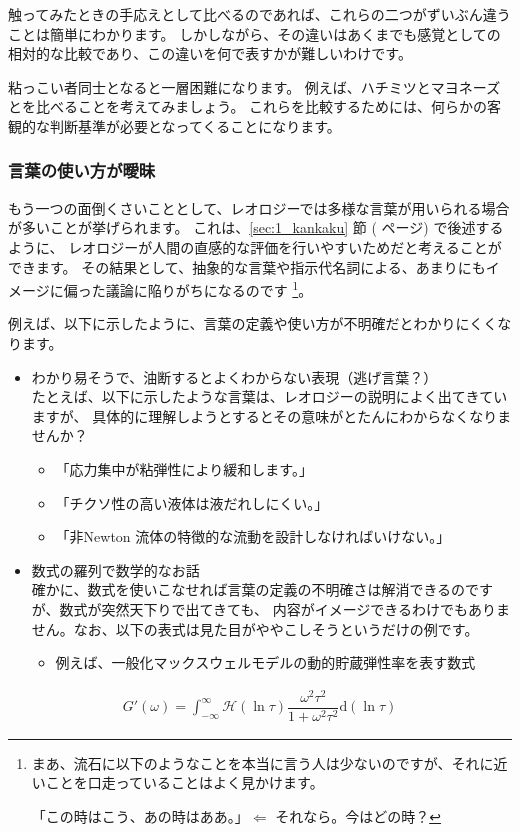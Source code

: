 \documentclass[uplatex,dvipdfmx,a4paper,11pt]{jsarticle}
\begin{document}
触ってみたときの手応えとして比べるのであれば、これらの二つがずいぶん違うことは簡単にわかります。
しかしながら、その違いはあくまでも感覚としての相対的な比較であり、この違いを何で表すかが難しいわけです。

粘っこい者同士となると一層困難になります。
例えば、ハチミツとマヨネーズとを比べることを考えてみましょう。 
これらを比較するためには、何らかの客観的な判断基準が必要となってくることになります。

\subsubsection{言葉の使い方が曖昧}

もう一つの面倒くさいこととして、レオロジーでは多様な言葉が用いられる場合が多いことが挙げられます。
これは、\ref{sec:1_kankaku} 節 (\pageref{sec:1_kankaku} ページ) で後述するように、
レオロジーが人間の直感的な評価を行いやすいためだと考えることができます。
その結果として、抽象的な言葉や指示代名詞による、あまりにもイメージに偏った議論に陥りがちになるのです
\footnote{まあ、流石に以下のようなことを本当に言う人は少ないのですが、それに近いことを口走っていることはよく見かけます。
	
「この時はこう、あの時はああ。」$\Leftarrow$ それなら。今はどの時？}。

例えば、以下に示したように、言葉の定義や使い方が不明確だとわかりにくくなります。
	
	\begin{itemize}
		\item わかり易そうで、油断するとよくわからない表現（逃げ言葉？）\\
		たとえば、以下に示したような言葉は、レオロジーの説明によく出てきていますが、
		具体的に理解しようとするとその意味がとたんにわからなくなりませんか？
		\begin{itemize}
			\item 「応力集中が粘弾性により緩和します。」
			\item 「チクソ性の高い液体は液だれしにくい。」
			\item 「非Newton 流体の特徴的な流動を設計しなければいけない。」
		\end{itemize}
		\item 数式の羅列で数学的なお話\\
		確かに、数式を使いこなせれば言葉の定義の不明確さは解消できるのですが、数式が突然天下りで出てきても、
		内容がイメージできるわけでもありません。なお、以下の表式は見た目がややこしそうというだけの例です。
		\begin{itemize}
			\item 例えば、一般化マックスウェルモデルの動的貯蔵弾性率を表す数式\\
		\end{itemize}
	\end{itemize}
	\vspace{-7mm}
	\begin{align*}
		\displaystyle G'(\omega) = \int_{-\infty}^{\infty} \mathcal{H}(\ln \tau)\dfrac{\omega^2 \tau^2}{1 + \omega^2 \tau^2} \mathrm{d}(\ln \tau)
	\end{align*}
\end{document}
